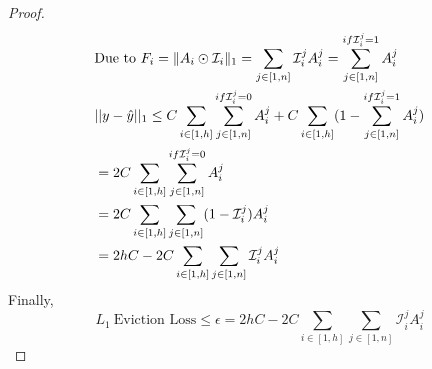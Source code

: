 \begin{proof}
{\begin{align}
			& \text{Due to } F_i = \lVert A_i \odot \mathcal{I}_i\rVert_1 = \sum_{j \in [1, n]}  \mathcal{I}_i^j A_i^j = \sum_{j \in [1, n]}^{if \mathcal{I}_i^j=1} A_i^j \notag \\
			& ||y-\hat{y}||_1	 \leq  C \sum_{i\in [1, h]} \sum_{j \in [1, n]}^{if \mathcal{I}_i^j=0} A_i^j +  C \sum_{i\in [1, h]} (1 - \sum_{j \in [1, n]}^{if \mathcal{I}_i^j=1}  A_i^j) \\
			& = 2C  \sum_{i\in [1, h]} \sum_{j \in [1, n]}^{if \mathcal{I}_i^j=0} A_i^j \\
			& = 2C \sum_{i\in [1, h]} \sum_{j \in [1, n]} (1-\mathcal{I}_i^j) A_i^j \\
			& =  2hC - 2C \sum_{i\in [1, h]} \sum_{j \in [1, n]} \mathcal{I}_i^j A_i^j
		\end{align}
		Finally,
		\begin{equation}
			L_1 \: \text{Eviction Loss} \leq \epsilon = 2hC - 2C\sum_{i\in [1, h]}\sum_{j \in [1,n ]} \mathcal{I}_i^jA_i^j
		\end{equation}
	}
\end{proof}

